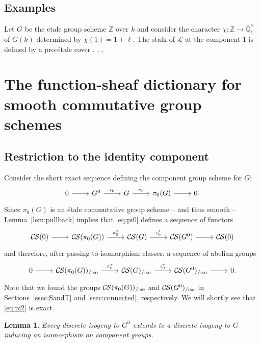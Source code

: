 \documentclass[10pt]{amsart}
\theoremstyle{plain}
\newtheorem{lemma}[theorem]{Lemma}
\theoremstyle{definition}
\theoremstyle{remark}
\newcommand{\ZZ}{{\mathbb{Z}}}
\newcommand{\EE}{\mathbb{\bar Q}_\ell}
\newcommand{\Fq}{k}
\newcommand{\EEx}{\EE^\times}
\newcommand{\cs}[1]{{\mathcal{#1}}}
\newcommand{\CS}{{\mathcal{C\hskip-0.8pt S}}}
\newcommand{\CSiso}[1]{\CS(#1)_{/\text{iso}}}
\begin{document}
\subsection{Examples}

Let $G$ be the etale group scheme $\ZZ$ over $\Fq$ and consider the character $\chi : \ZZ \to \EEx$ of $G(\Fq)$ determined by $\chi(1) = 1+\ell$.
The stalk of $\cs{L}$ at the component $1$ is defined
by a pro-\'etale cover  . . . 

\section{The function-sheaf dictionary for smooth commutative group schemes}\label{sec:main}


\subsection{Restriction to the identity component} \label{ssec:restriction}

Consider the short exact sequence
defining the component group scheme for $G$:
\begin{equation}\label{eq:pi0}
\begin{tikzcd}
0 \rar & G^0 \arrow{r}{\iota_0} & G \arrow{r}{\pi_0} & \pi_0(G) \rar & 0.
\end{tikzcd}
\end{equation}
Since $\pi_0(G)$ is an \'etale commutative group scheme -- and thus smooth --
Lemma~\ref{lem:pullback} implies that \eqref{eq:pi0} defines a sequence of functors
\begin{equation}\label{eq:pi1}
\begin{tikzcd}
\CS(0) \rar & \CS(\pi_0(G)) \arrow{r}{\pi_0^*} & \CS(G) \arrow{r}{\iota_0^*} & \CS(G^0) \rar & \CS(0)
\end{tikzcd}
\end{equation}
and therefore, after passing to isomorphism classes, a sequence of abelian groups
\begin{equation}\label{eq:pi2}
\begin{tikzcd}
0 \rar &
\CSiso{\pi_0(G)} \arrow{r}{\pi_0^*} & \CSiso{G} \arrow{r}{\iota_0^*} & \CSiso{G^0} \rar & 0.
\end{tikzcd}
\end{equation}
 Note that we found the groups $\CSiso{\pi_0(G)}$ and $\CSiso{G^0}$
in Sections~\ref{ssec:SandT} and \ref{ssec:connected}, respectively.
We will shortly see that \eqref{eq:pi2} is exact.


\begin{lemma}\label{lemma:ext}
Every discrete isogeny to $G^0$ extends to a discrete
isogeny to $G$ inducing an isomorphism on component groups.
\end{lemma}
\end{document}
